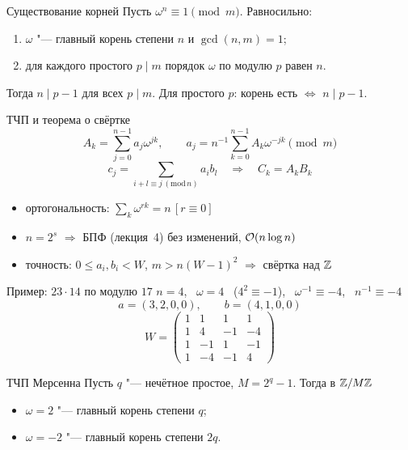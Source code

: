 \documentclass{ca-slides}
\begin{document}
\begin{theoremframe}{Существование корней}
  Пусть $\omega^n \equiv 1 \pmod m$. Равносильно:
  \begin{enumerate}
    \item $\omega$ "--- главный корень степени $n$ и $\gcd(n, m) = 1$;
    \item для каждого простого $p \mid m$ порядок $\omega$ по модулю $p$ равен $n$.
  \end{enumerate}
  Тогда $n \mid p - 1$ для всех $p \mid m$. Для простого $p$: корень есть $\Leftrightarrow$
  $n \mid p - 1$.
\end{theoremframe}

\begin{canvasframe}{ТЧП и теорема о свёртке}
  \small
  \[
    A_k = \sum_{j=0}^{n-1} a_j \omega^{jk}, \qquad
    a_j = n^{-1} \sum_{k=0}^{n-1} A_k \omega^{-jk} \pmod m
  \]
  \[
    c_j = \sum_{i + l \equiv j \,(\mathrm{mod}\, n)} a_i b_l \quad\Longrightarrow\quad
    C_k = A_k B_k
  \]
  \begin{itemize}
    \item ортогональность: $\sum_k \omega^{rk} = n\,[r \equiv 0]$
    \item $n = 2^s$ $\Rightarrow$ БПФ (лекция~4) без изменений, $\mathcal{O}(n \log n)$
    \item точность: $0 \le a_i, b_i < W$, $m > n(W - 1)^2$ $\Rightarrow$ свёртка над $\mathbb{Z}$
  \end{itemize}
\end{canvasframe}

\begin{canvasframe}{Пример: $23 \cdot 14$ по модулю $17$}
  \small
  $n = 4$, \ $\omega = 4$ \ ($4^2 \equiv -1$), \ $\omega^{-1} \equiv -4$, \
  $n^{-1} \equiv -4$
  \[
    a = (3, 2, 0, 0), \qquad b = (4, 1, 0, 0)
  \]
  \[
    W = \begin{pmatrix} 1 & 1 & 1 & 1\\ 1 & 4 & -1 & -4\\ 1 & -1 & 1 & -1\\ 1 & -4 & -1 & 4
    \end{pmatrix}
  \]
  \notearea[0.2\textheight]
\end{canvasframe}

\begin{theoremframe}{ТЧП Мерсенна}
  Пусть $q$ "--- нечётное простое, $M = 2^q - 1$. Тогда в $\mathbb{Z}/M\mathbb{Z}$
  \begin{itemize}
    \item $\omega = 2$ "--- главный корень степени $q$;
    \item $\omega = -2$ "--- главный корень степени $2q$.
  \end{itemize}
\end{theoremframe}
\end{document}
